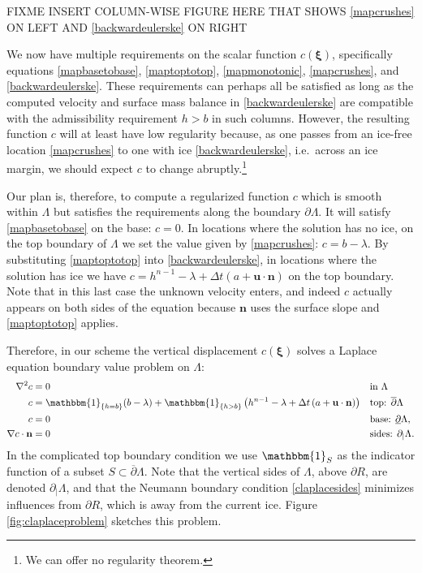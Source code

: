 \documentclass[letterpaper,final,12pt,reqno]{amsart}
\newcommand{\grad}{\nabla}
\newcommand{\bn}{\mathbf{n}}
\newcommand{\bu}{\mathbf{u}}
\newcommand{\bxi}{\bm{\xi}}
\begin{document}
FIXME INSERT COLUMN-WISE FIGURE HERE THAT SHOWS \eqref{mapcrushes} ON LEFT AND \eqref{backwardeulerske} ON RIGHT

We now have multiple requirements on the scalar function $c(\bxi)$, specifically equations \eqref{mapbasetobase}, \eqref{maptoptotop}, \eqref{mapmonotonic}, \eqref{mapcrushes}, and \eqref{backwardeulerske}.  These requirements can perhaps all be satisfied as long as the computed velocity and surface mass balance in \eqref{backwardeulerske} are compatible with the admissibility requirement $h>b$ in such columns.  However, the resulting function $c$ will at least have low regularity because, as one passes from an ice-free location \eqref{mapcrushes} to one with ice \eqref{backwardeulerske}, i.e.~across an ice margin, we should expect $c$ to change abruptly.\footnote{We can offer no regularity theorem.}

Our plan is, therefore, to compute a regularized function $c$ which is smooth within $\Lambda$ but satisfies the requirements along the boundary $\partial \Lambda$.  It will satisfy \eqref{mapbasetobase} on the base: $c=0$.  In locations where the solution has no ice, on the top boundary of $\Lambda$ we set the value given by \eqref{mapcrushes}: $c=b-\lambda$.  By substituting \eqref{maptoptotop} into \eqref{backwardeulerske}, in locations where the solution has ice we have $c=h^{n-1}-\lambda + \Delta t\left(a + \bu \cdot \bn\right)$ on the top boundary.  Note that in this last case the unknown velocity enters, and indeed $c$ actually appears on both sides of the equation because $\bn$ uses the surface slope and \eqref{maptoptotop} applies.

Therefore, in our scheme the vertical displacement $c(\bxi)$ solves a Laplace equation boundary value problem on $\Lambda$:
\begin{align}
        \grad^2 c &= 0 &&\text{in } \Lambda \label{claplace} \\
                c &= \mathbbm{1}_{\{h=b\}} (b-\lambda) + \mathbbm{1}_{\{h>b\}} \left(h^{n-1}-\lambda + \Delta t\left(a + \bu \cdot \bn\right)\right) &&\text{top: } \overline{\partial} \Lambda  \label{claplacetop} \\
                c &= 0 &&\text{base: } \underline{\partial} \Lambda,  \label{claplacebase} \\
 \grad c\cdot \bn &= 0 &&\text{sides: } \partial_{|} \Lambda.  \label{claplacesides}
\end{align}
In the complicated top boundary condition we use $\mathbbm{1}_S$ as the indicator function of a subset $S\subset \overline{\partial} \Lambda$.  Note that the vertical sides of $\Lambda$, above $\partial R$, are denoted $\partial_{|} \Lambda$, and that the Neumann boundary condition \eqref{claplacesides} minimizes influences from $\partial R$, which is away from the current ice.  Figure \ref{fig:claplaceproblem} sketches this problem.
\end{document}
